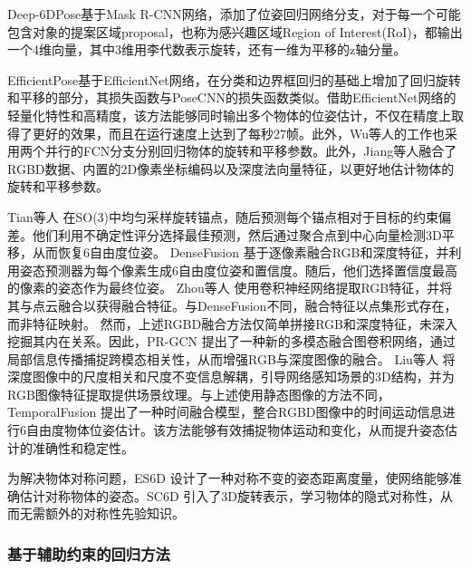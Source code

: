 \par Deep-6DPose\cite{Deep-6DPose}基于Mask R-CNN网络\cite{maskrcnn}，添加了位姿回归网络分支，对于每一个可能包含对象的提案区域proposal，也称为感兴趣区域Region of Interest(RoI)，都输出一个4维向量，其中3维用李代数表示旋转，还有一维为平移的z轴分量。

\par EfficientPose\cite{bukschat2020efficientpose}基于EfficientNet网络\cite{koonce2021efficientnet}，在分类和边界框回归的基础上增加了回归旋转和平移的部分，其损失函数与PoseCNN的损失函数类似。借助EfficientNet网络的轻量化特性和高精度，该方法能够同时输出多个物体的位姿估计，不仅在精度上取得了更好的效果，而且在运行速度上达到了每秒27帧。此外，Wu等人的工作\cite{wu2018real}也采用两个并行的FCN\cite{FCN}分支分别回归物体的旋转和平移参数。此外，Jiang等人\cite{jiang2022uni6d}融合了RGBD数据、内置的2D像素坐标编码以及深度法向量特征，以更好地估计物体的旋转和平移参数。

\par Tian等人\cite{tian2020robust} 在SO(3)中均匀采样旋转锚点，随后预测每个锚点相对于目标的约束偏差。他们利用不确定性评分选择最佳预测，然后通过聚合点到中心向量检测3D平移，从而恢复6自由度位姿。
DenseFusion\cite{wang2019densefusion} 基于逐像素融合RGB和深度特征，并利用姿态预测器为每个像素生成6自由度位姿和置信度。随后，他们选择置信度最高的像素的姿态作为最终位姿。
Zhou等人\cite{zhou2020novel} 使用卷积神经网络提取RGB特征，并将其与点云融合以获得融合特征。与DenseFusion\cite{wang2019densefusion}不同，融合特征以点集形式存在，而非特征映射。
然而，上述RGBD融合方法仅简单拼接RGB和深度特征，未深入挖掘其内在关系。因此，PR-GCN\cite{Zhou2021PRGCNAD} 提出了一种新的多模态融合图卷积网络，通过局部信息传播捕捉跨模态相关性，从而增强RGB与深度图像的融合。
Liu等人\cite{liu2023depth} 将深度图像中的尺度相关和尺度不变信息解耦，引导网络感知场景的3D结构，并为RGB图像特征提取提供场景纹理。与上述使用静态图像的方法不同，TemporalFusion\cite{mu2021temporalfusion} 提出了一种时间融合模型，整合RGBD图像中的时间运动信息进行6自由度物体位姿估计。该方法能够有效捕捉物体运动和变化，从而提升姿态估计的准确性和稳定性。

\par 为解决物体对称问题，ES6D\cite{mo2022es6d} 设计了一种对称不变的姿态距离度量，使网络能够准确估计对称物体的姿态。SC6D\cite{cai2022sc6d} 引入了3D旋转表示，学习物体的隐式对称性，从而无需额外的对称性先验知识。

\subsubsection{基于辅助约束的回归方法}\label{基于辅助约束的回归方法}

